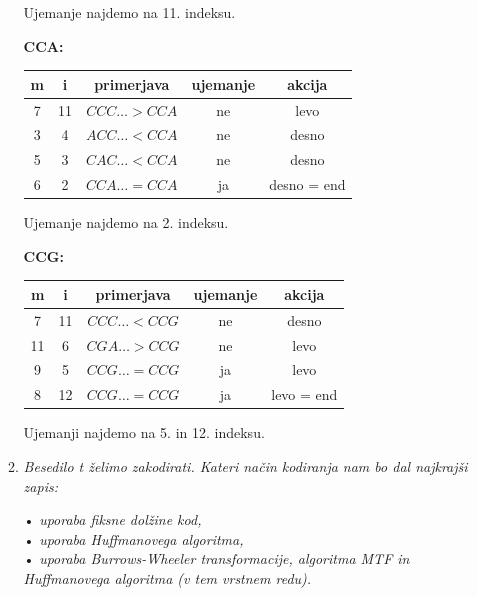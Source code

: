 \documentclass{article}
\begin{document}
\begin{enumerate}
\begin{enumerate}
\begin{center}
					Ujemanje najdemo na 11. indeksu.
				\end{center}

				\textbf{CCA:}
				
				\begin{center}
					\begin{tabular}{|c|c||c|c|c|}
						\hline
						m & i & primerjava & ujemanje & akcija \\
						\hline
						\hline
						7 & 11 & $CCC\dots > CCA$ & ne & levo \\
						\hline
						3 & 4 & $ACC\dots < CCA$ & ne & desno \\
						\hline
						5 & 3 & $CAC\dots < CCA$ & ne & desno \\
						\hline
						6 & 2 & $CCA\dots = CCA$ & ja & desno = end \\
						\hline
					\end{tabular}

					Ujemanje najdemo na 2. indeksu.
				\end{center}

				\textbf{CCG:}

				\begin{center}
					\begin{tabular}{|c|c||c|c|c|}
						\hline
						m & i & primerjava & ujemanje & akcija \\
						\hline
						\hline
						7 & 11 & $CCC\dots < CCG$ & ne & desno \\
						\hline
						11 & 6 & $CGA\dots > CCG$ & ne & levo \\
						\hline
						9 & 5 & $CCG\dots = CCG$ & ja & levo \\
						\hline
						8 & 12 & $CCG\dots = CCG$ & ja & levo = end \\
						\hline
					\end{tabular}

					Ujemanji najdemo na 5. in 12. indeksu.
				\end{center}

				\newpage

			\item \textit{Besedilo t želimo zakodirati. Kateri način kodiranja nam bo dal 
			najkrajši zapis:}

			• \textit{uporaba fiksne dolžine kod,} \\
			• \textit{uporaba Huffmanovega algoritma,} \\
			• \textit{uporaba Burrows-Wheeler transformacije, algoritma MTF in 
			Huffmanovega algoritma (v tem vrstnem redu).}


\end{enumerate}
\end{enumerate}
\end{document}
